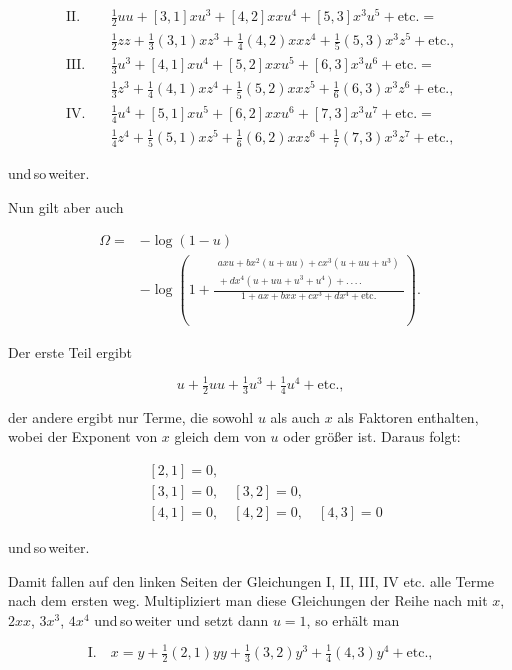 \[
\begin{aligned}
\text{II.}\quad & \tfrac12 uu+[3,1]xu^3+[4,2]xxu^4+[5,3]x^3u^5+\text{etc.} = \\
& \tfrac12 zz+\tfrac13(3,1)xz^3+\tfrac14(4,2)xxz^4+\tfrac15(5,3)x^3z^5+\text{etc.,}\\[6pt]
\text{III.}\quad & \tfrac13 u^3+[4,1]xu^4+[5,2]xxu^5+[6,3]x^3u^6+\text{etc.} = \\
& \tfrac13 z^3+\tfrac14(4,1)xz^4+\tfrac15(5,2)xxz^5+\tfrac16(6,3)x^3z^6+\text{etc.,}\\[6pt]
\text{IV.}\quad & \tfrac14 u^4+[5,1]xu^5+[6,2]xxu^6+[7,3]x^3u^7+\text{etc.} = \\
& \tfrac14 z^4+\tfrac15(5,1)xz^5+\tfrac16(6,2)xxz^6+\tfrac17(7,3)x^3z^7+\text{etc.,}
\end{aligned}
\]

\noindent und\,so\,weiter.

Nun gilt aber auch

\[
\begin{aligned}\Omega ={}& -\log(1-u)\\ &-\log\left(1+\frac{\begin{gathered}axu+bx^2(u+uu)+cx^3(u+uu+u^3)\\ {}+dx^4(u+uu+u^3+u^4)+.\,.\,.\,.\end{gathered}}{1+ax+bxx+cx^3+dx^4+\text{etc.}}\right).
\end{aligned}
\]

Der erste Teil ergibt

\[
u+\tfrac12 uu+\tfrac13 u^3+\tfrac14 u^4+\text{etc.,}
\]

\noindent der andere ergibt nur Terme, die sowohl $u$ als auch $x$ als Faktoren enthalten, wobei der Exponent von $x$ gleich dem von $u$ oder größer ist. Daraus folgt:

\[
\begin{aligned}
& [2,1]=0,\\
& [3,1]=0,\quad [3,2]=0,\\
& [4,1]=0,\quad [4,2]=0,\quad [4,3]=0
\end{aligned}
\]

\noindent und\,so\,weiter.

Damit fallen auf den linken Seiten der Gleichungen I, II, III, IV etc. alle Terme nach dem ersten weg. Multipliziert man diese Gleichungen der Reihe nach mit $x$, $2xx$, $3x^3$, $4x^4$ und\,so\,weiter und setzt dann $u=1$, so erhält man

\[\text{I.}\quad x = y + \tfrac12(2,1)yy+\tfrac13(3,2)y^3+\tfrac14(4,3)y^4+\text{etc.,}\]

